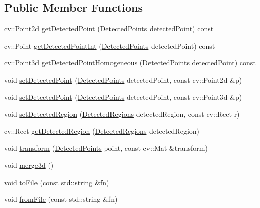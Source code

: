 \subsection*{Public Member Functions}
\begin{DoxyCompactItemize}
\item 
cv\+::\+Point2d \hyperlink{class_face3_d_1_1_face_geometry_a9ce57cf061663a02267d9fee423dbc73}{get\+Detected\+Point} (\hyperlink{class_face3_d_1_1_face_geometry_aab597f00966010882927a4974649bf11}{Detected\+Points} detected\+Point) const 
\item 
cv\+::\+Point \hyperlink{class_face3_d_1_1_face_geometry_a3c4e46361330951648193f24b8a5329d}{get\+Detected\+Point\+Int} (\hyperlink{class_face3_d_1_1_face_geometry_aab597f00966010882927a4974649bf11}{Detected\+Points} detected\+Point) const 
\item 
cv\+::\+Point3d \hyperlink{class_face3_d_1_1_face_geometry_a6aed421ae667cc1b67b4bf6a891ff634}{get\+Detected\+Point\+Homogeneous} (\hyperlink{class_face3_d_1_1_face_geometry_aab597f00966010882927a4974649bf11}{Detected\+Points} detected\+Point) const 
\item 
void \hyperlink{class_face3_d_1_1_face_geometry_a0cbcfd1b63284e1d1fa1f91a87b8f06a}{set\+Detected\+Point} (\hyperlink{class_face3_d_1_1_face_geometry_aab597f00966010882927a4974649bf11}{Detected\+Points} detected\+Point, const cv\+::\+Point2d \&p)
\item 
void \hyperlink{class_face3_d_1_1_face_geometry_a737543f3299fee8c845f2af2e25355e1}{set\+Detected\+Point} (\hyperlink{class_face3_d_1_1_face_geometry_aab597f00966010882927a4974649bf11}{Detected\+Points} detected\+Point, const cv\+::\+Point3d \&p)
\item 
void \hyperlink{class_face3_d_1_1_face_geometry_a9728c2a48b99682f74910f8924cc3f91}{set\+Detected\+Region} (\hyperlink{class_face3_d_1_1_face_geometry_a6db32685a7f429d507b8e31f7c42fe77}{Detected\+Regions} detected\+Region, const cv\+::\+Rect r)
\item 
cv\+::\+Rect \hyperlink{class_face3_d_1_1_face_geometry_a85251824e8909cca4d35461744ccc40f}{get\+Detected\+Region} (\hyperlink{class_face3_d_1_1_face_geometry_a6db32685a7f429d507b8e31f7c42fe77}{Detected\+Regions} detected\+Region)
\item 
void \hyperlink{class_face3_d_1_1_face_geometry_a876baec2ea039287ec5d45784d9b0242}{transform} (\hyperlink{class_face3_d_1_1_face_geometry_aab597f00966010882927a4974649bf11}{Detected\+Points} point, const cv\+::\+Mat \&transform)
\item 
void \hyperlink{class_face3_d_1_1_face_geometry_a653c167dc85c8eb861fa8fba73ecfd72}{merge3d} ()
\item 
void \hyperlink{class_face3_d_1_1_face_geometry_a7ff82baf7bb2a3f2ddc883a34e9ca945}{to\+File} (const std\+::string \&fn)
\item 
void \hyperlink{class_face3_d_1_1_face_geometry_ab16fe4e14fa421e2d067a7bacee8c844}{from\+File} (const std\+::string \&fn)
\end{DoxyCompactItemize}
